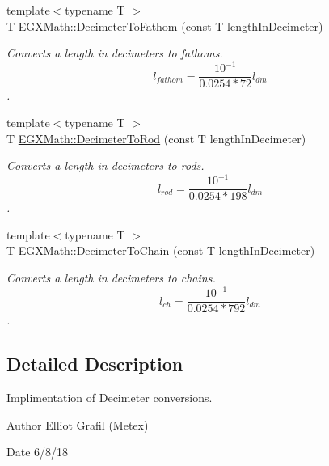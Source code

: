 \begin{DoxyCompactItemize}
{\footnotesize template$<$typename T $>$ }\\T \mbox{\hyperlink{group___e_g_x_math-_conversions-_length_conversions-_s_i-_decimeter-_nautical_ga1b0035d719274942290afe80600a2b27}{E\+G\+X\+Math\+::\+Decimeter\+To\+Fathom}} (const T length\+In\+Decimeter)
\begin{DoxyCompactList}\small\item\em Converts a length in decimeters to fathoms. \[ l_{fathom}= \frac{10^{-1}}{0.0254 * 72} l_{dm} \]. \end{DoxyCompactList}\item 
{\footnotesize template$<$typename T $>$ }\\T \mbox{\hyperlink{group___e_g_x_math-_conversions-_length_conversions-_s_i-_decimeter-_surveyors_gaf34122272f5724db35f8400d284e2ec8}{E\+G\+X\+Math\+::\+Decimeter\+To\+Rod}} (const T length\+In\+Decimeter)
\begin{DoxyCompactList}\small\item\em Converts a length in decimeters to rods. \[ l_{rod}= \frac{10^{-1}}{0.0254 * 198} l_{dm} \]. \end{DoxyCompactList}\item 
{\footnotesize template$<$typename T $>$ }\\T \mbox{\hyperlink{group___e_g_x_math-_conversions-_length_conversions-_s_i-_decimeter-_surveyors_gaae746f9b34bc92e17f9117f5b139fdc4}{E\+G\+X\+Math\+::\+Decimeter\+To\+Chain}} (const T length\+In\+Decimeter)
\begin{DoxyCompactList}\small\item\em Converts a length in decimeters to chains. \[ l_{ch}= \frac{10^{-1}}{0.0254 * 792} l_{dm} \]. \end{DoxyCompactList}\end{DoxyCompactItemize}


\subsection{Detailed Description}
Implimentation of Decimeter conversions. 

\begin{DoxyAuthor}{Author}
Elliot Grafil (Metex) 
\end{DoxyAuthor}
\begin{DoxyDate}{Date}
6/8/18 
\end{DoxyDate}
